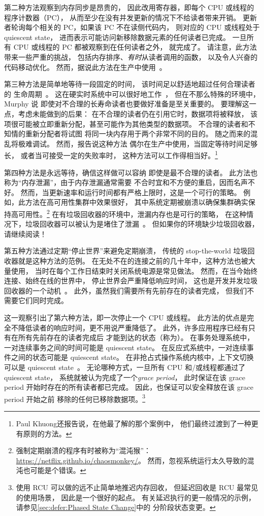 第二种方法观察到内存同步是昂贵的，
因此改用寄存器，即每个 CPU 或线程的程序计数器（PC），
从而至少在没有并发更新的情况下不给读者带来开销。
更新者轮询每个相关的 PC，如果该 PC 不在读侧代码内，
则对应的 CPU 或线程处于 quiescent state，
进而表示可能访问新移除数据元素的任何读者已完成。
一旦所有 CPU 或线程的 PC 都被观察到在任何读者之外，
就完成了。
请注意，此方法带来一些严重的挑战，
包括内存排序、\emph{有时}从读者调用的函数，
以及令人兴奋的代码移动优化。
然而，据说此方法在生产中使用~\cite{MikeAsh2015Apple}。

第三种方法是简单地等待一段固定的时间，
该时间足以舒适地超过任何合理读者的
生命周期~\cite{Jacobson93,AjuJohn95}。
这在硬实时系统中可以很好地工作~\cite{YuxinRen2018RTRCU}，
但在不那么特殊的环境中，Murphy 说
即使对不合理的长寿命读者也要做好准备是至关重要的。
要理解这一点，考虑未能做到的后果：
在不合理的读者仍在引用它时，数据项将被释放，
该项很可能被立即重新分配，甚至可能作为其他类型的数据项。
不合理的读者和不知情的重新分配者将试图
将同一块内存用于两个非常不同的目的。
随之而来的混乱将极难调试。
然而，报告说这种方法
偶尔在生产中使用，当固定等待时间足够长，
或者当可接受一定的失败率时，
这种方法可以工作得相当好。\footnote{
	Paul Khuong还报告说，在他最了解的那个案例中，
	他们最终过渡到了一种更有原则的方法。}

第四种方法是永远等待，确信这样做可以容纳
即使是最不合理的读者。
此方法也称为``内存泄漏''，由于内存泄漏通常需要
不合时宜和不方便的重启，因而名声不好。
然而，当更新速率和运行时间都有严格上限时，这是一个可行的策略。
例如，此方法在高可用性集群中效果很好，
其中系统定期被崩溃以确保集群确实保持高可用性。\footnote{
	强制定期崩溃的程序有时被称为``混沌猴''：
	\url{https://netflix.github.io/chaosmonkey/}。
	然而，忽视系统运行太久导致的混沌也可能是个错误。}
在有垃圾回收器的环境中，泄漏内存也是可行的策略，
在这种情况下，垃圾回收器可以被认为是堵住了泄漏~\cite{Kung80}。
但如果你的环境缺少垃圾回收器，请继续阅读！

第五种方法通过定期``停止世界''来避免定期崩溃，
传统的 stop-the-world 垃圾回收器就是这种方法的范例。
在无处不在的连接之前的几十年中，这种方法也被大量使用，
当时在每个工作日结束时关闭系统电源是常见做法。
然而，在当今始终连接、始终在线的世界中，
停止世界会严重降低响应时间，
这也是开发并发垃圾回收器的一个动机~\cite{DavidFBacon2003RTGC}。
此外，虽然我们需要所有先前存在的读者完成，
但我们不需要它们同时完成。

这一观察引出了第六种方法，即一次停止一个 CPU 或线程。
此方法的优点是完全不降低读者的响应时间，更不用说严重降低了。
此外，许多应用程序已经有只有在所有先前存在的读者完成后
才能到达的状态（称为\emph{}）。
在事务处理系统中，一对连续事务之间的时间可能是 quiescent state。
在反应式系统中，一对连续事件之间的状态可能是 quiescent state。
在非抢占式操作系统内核中，上下文切换可以是
quiescent state~\cite{McKenney98}。
无论哪种方式，一旦所有 CPU 和/或线程都通过了 quiescent state，
系统就被认为完成了一个\emph{grace period}，
此时保证在该 grace period 开始时存在的所有读者都已完成。
因此，也保证可以安全释放在该 grace period 开始之前
移除的任何已移除数据项。\footnote{
	使用 RCU 可以做的远不止简单地推迟内存回收，
	但延迟回收是 RCU 最常见的使用场景，
	因此是一个很好的起点。
	有关延迟执行的更一般情况的示例，
	请参见\cref{sec:defer:Phased State Change}中的
	分阶段状态变更。}

